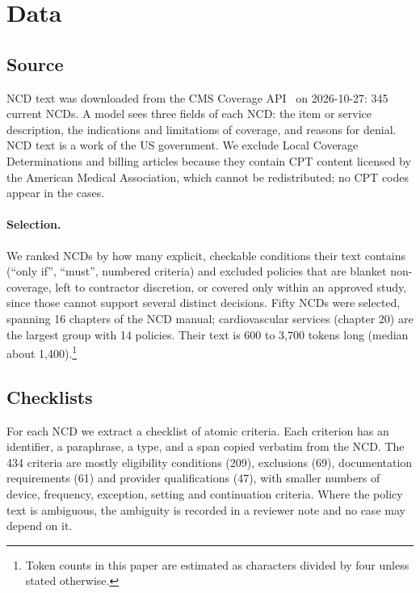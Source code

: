 \documentclass[11pt]{article}
\begin{document}
\section{Data}
\label{sec:data}

\subsection{Source}
NCD text was downloaded from the CMS Coverage API~\citep{cmscoverageapi} on 2026-10-27: 345
current NCDs. A model sees three fields of each NCD: the item or service description, the
indications and limitations of coverage, and reasons for denial. NCD text is a work of the US
government. We exclude Local Coverage Determinations and billing articles because they contain
CPT content licensed by the American Medical Association, which cannot be redistributed; no CPT
codes appear in the cases.

\paragraph{Selection.} We ranked NCDs by how many explicit, checkable conditions their text
contains (``only if'', ``must'', numbered criteria) and excluded policies that are blanket
non-coverage, left to contractor discretion, or covered only within an approved study, since
those cannot support several distinct decisions. Fifty NCDs were selected, spanning 16 chapters
of the NCD manual; cardiovascular services (chapter 20) are the largest group with 14 policies.
Their text is 600 to 3,700 tokens long (median about 1,400).\footnote{Token counts in this paper
are estimated as characters divided by four unless stated otherwise.}

\subsection{Checklists}
For each NCD we extract a checklist of atomic criteria. Each criterion has an identifier, a
paraphrase, a type, and a span copied verbatim from the NCD. The 434 criteria are mostly
eligibility conditions (209), exclusions (69), documentation requirements (61) and provider
qualifications (47), with smaller numbers of device, frequency, exception, setting and
continuation criteria. Where the policy text is ambiguous, the ambiguity is recorded in a
reviewer note and no case may depend on it.
\end{document}
